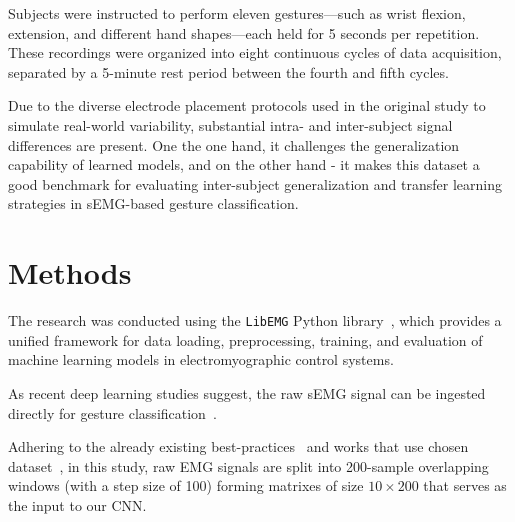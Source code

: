 Subjects were instructed to perform eleven gestures—such as wrist flexion, extension, and different hand shapes—each held for 5 seconds per repetition. These recordings were organized into eight continuous cycles of data acquisition, separated by a 5-minute rest period between the fourth and fifth cycles.

Due to the diverse electrode placement protocols used in the original study to simulate real-world variability, substantial intra- and inter-subject signal differences are present. One the one hand, it challenges the generalization capability of learned models, and on the other hand - it makes this dataset a good benchmark for evaluating inter-subject generalization and transfer learning strategies in sEMG-based gesture classification.

\section{Methods}

The research was conducted using the \texttt{LibEMG} Python library~\cite{LibEMG2023}, which provides a unified framework for data loading, preprocessing, training, and evaluation of machine learning models in electromyographic control systems.

As recent deep learning studies suggest, the raw sEMG signal can be ingested directly for gesture classification~\cite{Oskoei2007,Rehman2018,Cote2019}.

Adhering to the already existing best-practices~\cite{Smith2011} and works that use chosen dataset~\cite{Cote2019_3DC,LibEMG2023}, in this study, raw EMG signals are split into 200-sample overlapping windows (with a step size of 100) forming matrixes of size $10 \times 200$ that serves as the input to our CNN. 

